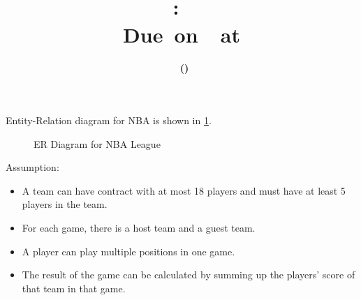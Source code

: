 \documentclass[12pt,letterpaper,titlepage,en-US]{article}
\title{
    \vspace{2in}
    \textmd{\textbf{\hmwkClassName \\\hmwkClass:\ \hmwkTitle}}\\
    \normalsize\vspace{0.1in}\small{Due\ on\ \DTMusedate{DueDate}\ at \DTMusetime{DueDate} }\\
    \vspace{0.1in}\large{\textit{\hmwkClassInstructor}}
    \vspace{3in}
}
\author{\textbf{\hmwkAuthorName\ \footnotesize{(\hmwkAuthorNetID)}} \\ \hmwkAuthorUTDEmail}
\date{}
\begin{document}
\maketitle


\pagebreak

\begin{homeworkProblem}
Entity-Relation diagram for NBA is shown in \cref{nba_er}.

\begin{figure}[!htb]
  \caption{ER Diagram for NBA League}
  \label{nba_er}
\end{figure}

Assumption:

\begin{itemize}
    \item A team can have contract with at most 18 players and must have at least 5 players in the team.
    \item For each game, there is a host team and a guest team.
    \item A player can play multiple positions in one game.
    \item The result of the game can be calculated by summing up the players' score of that team in that game.
\end{itemize}

\end{homeworkProblem}

\pagebreak
\end{document}
